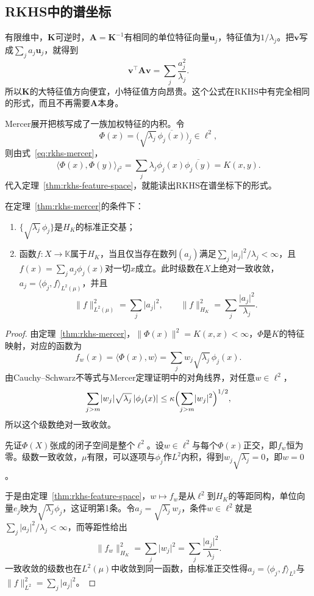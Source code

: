 \subsection{RKHS中的谱坐标}
\label{sec:rkhs-spectral-coordinates}

有限维中，$\bm K$可逆时，$\bm A=\bm K^{-1}$有相同的单位特征向量$\bm u_j$，特征值为$1/\lambda_j$。把$\bm v$写成$\sum_ja_j\bm u_j$，就得到
\[
\bm v^{\top}\bm A\bm v=\sum_j\frac{a_j^2}{\lambda_j}.
\]
所以$\bm K$的大特征值方向便宜，小特征值方向昂贵。这个公式在RKHS中有完全相同的形式，而且不再需要$\bm A$本身。

Mercer展开把核写成了一族加权特征的内积。令
\[
\Phi(x)=\bigl(\sqrt{\lambda_j}\,\overline{\phi_j(x)}\bigr)_j\in\ell^2 ,
\]
则由式~\eqref{eq:rkhs-mercer}，
\[
\langle\Phi(x),\Phi(y)\rangle_{\ell^2}=\sum_j\lambda_j\phi_j(x)\overline{\phi_j(y)}=K(x,y).
\]
代入定理~\ref{thm:rkhs-feature-space}，就能读出RKHS在谱坐标下的形式。

\begin{theorem}[RKHS的谱表示]
\label{thm:rkhs-spectral-norm}
在定理~\ref{thm:rkhs-mercer}的条件下：
\begin{enumerate}
\item $\{\sqrt{\lambda_j}\,\phi_j\}$是$H_K$的标准正交基；
\item 函数$f:X\to\mathbb K$属于$H_K$，当且仅当存在数列$(a_j)$满足$\sum_j\lvert a_j\rvert^2/\lambda_j<\infty$，且$f(x)=\sum_ja_j\phi_j(x)$对一切$x$成立。此时级数在$X$上绝对一致收敛，$a_j=\langle\phi_j,f\rangle_{L^2(\mu)}$，并且
\begin{equation}
\lVert f\rVert_{L^2(\mu)}^2=\sum_j\lvert a_j\rvert^2,\qquad \lVert f\rVert_{H_K}^2=\sum_j\frac{\lvert a_j\rvert^2}{\lambda_j}.
\label{eq:rkhs-two-norms}
\end{equation}
\end{enumerate}
\end{theorem}

\begin{proof}
由定理~\ref{thm:rkhs-mercer}，$\lVert\Phi(x)\rVert^2=K(x,x)<\infty$，$\Phi$是$K$的特征映射，对应的函数为
\[
f_w(x)=\langle\Phi(x),w\rangle=\sum_jw_j\sqrt{\lambda_j}\,\phi_j(x).
\]
由Cauchy--Schwarz不等式与Mercer定理证明中的对角线界，对任意$w\in\ell^2$，
\[
\sum_{j>m}\lvert w_j\rvert\sqrt{\lambda_j}\,\lvert\phi_j(x)\rvert\leq\kappa\Bigl(\sum_{j>m}\lvert w_j\rvert^2\Bigr)^{1/2} ,
\]
所以这个级数绝对一致收敛。

先证$\Phi(X)$张成的闭子空间是整个$\ell^2$。设$w\in\ell^2$与每个$\Phi(x)$正交，即$f_w$恒为零。级数一致收敛，$\mu$有限，可以逐项与$\phi_j$作$L^2$内积，得到$w_j\sqrt{\lambda_j}=0$，即$w=0$。

于是由定理~\ref{thm:rkhs-feature-space}，$w\mapsto f_w$是从$\ell^2$到$H_K$的等距同构，单位向量$e_j$映为$\sqrt{\lambda_j}\phi_j$，这证明第1条。令$a_j=\sqrt{\lambda_j}\,w_j$，条件$w\in\ell^2$就是$\sum_j\lvert a_j\rvert^2/\lambda_j<\infty$，而等距性给出
\[
\lVert f_w\rVert_{H_K}^2=\sum_j\lvert w_j\rvert^2=\sum_j\frac{\lvert a_j\rvert^2}{\lambda_j} .
\]
一致收敛的级数也在$L^2(\mu)$中收敛到同一函数，由标准正交性得$a_j=\langle\phi_j,f\rangle_{L^2}$与$\lVert f\rVert_{L^2}^2=\sum_j\lvert a_j\rvert^2$。
\end{proof}

